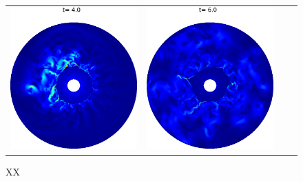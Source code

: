\documentclass[preprint, 11pt]{article}
\begin{document}
\begin{figure}[!h]
\begin{tabular}{cccc}
    \includegraphics[scale=0.24]{figures/chj_r2wp_blended_t4p0.png} &
    \includegraphics[scale=0.24]{figures/chj_r2wp_blended_t6p0.png}
  \end{tabular}
  \caption{XX}
\end{figure}
\end{document}
